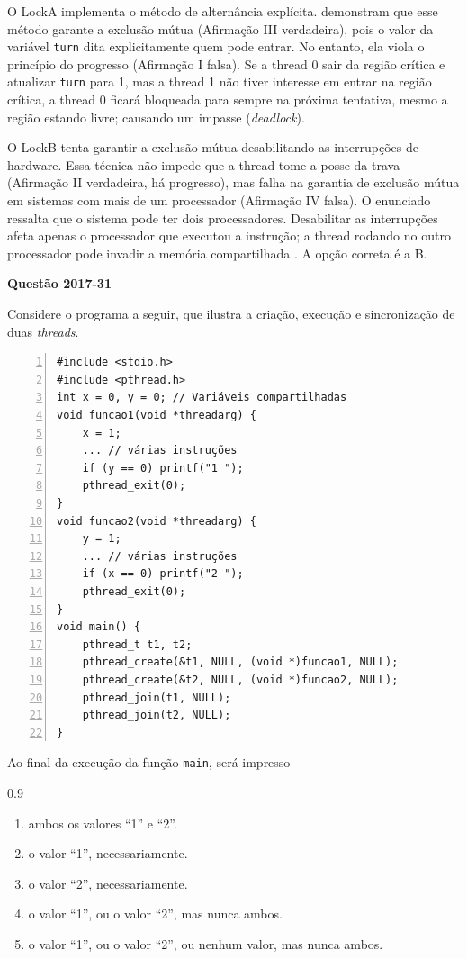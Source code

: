 \documentclass[12pt,a4paper]{article}
\newenvironment{Question}[1]{%
    \pdfbookmark[3]{Questão #1}{q:#1}
    \label{q:#1}
    \par\bigskip\noindent
    \textbf{Questão #1} \dotfill
    \par\noindent
    \nopagebreak
    \ignorespaces
}{%
    \noindent\dotfill
}
\newenvironment{QuestionOptions}{%
    \begin{spacing}{0.9}%
    \small
    \begin{enumerate}[label=\Alph*)]
}{%
    \end{enumerate}
    \end{spacing}
}
\begin{document}
O LockA implementa o método de alternância explícita.
\textcite[seç.~2.3.2--3]{tanenbaum2016} demonstram que esse método garante a exclusão mútua (Afirmação III verdadeira),
pois o valor da variável \texttt{turn} dita explicitamente quem pode entrar.
No entanto, ela viola o princípio do progresso (Afirmação I falsa).
Se a thread 0 sair da região crítica e atualizar \texttt{turn} para 1,
mas a thread 1 não tiver interesse em entrar na região crítica, a thread 0 ficará bloqueada para sempre na próxima tentativa,
mesmo a região estando livre; causando um impasse (\textit{deadlock}).

O LockB tenta garantir a exclusão mútua desabilitando as interrupções de hardware.
Essa técnica não impede que a thread tome a posse da trava (Afirmação II verdadeira, há progresso),
mas falha na garantia de exclusão mútua em sistemas com mais de um processador (Afirmação IV falsa).
O enunciado ressalta que o sistema pode ter dois processadores.
Desabilitar as interrupções afeta apenas o processador que executou a instrução;
a thread rodando no outro processador pode invadir a memória compartilhada \parencite[seç.~2.3.1]{tanenbaum2016}.
A opção correta é a B.

\begin{Question}{2017-31}
Considere o programa a seguir, que ilustra a criação, execução e sincronização de duas \textit{threads}.
\begin{Verbatim}[numbers=left]
#include <stdio.h>
#include <pthread.h>
int x = 0, y = 0; // Variáveis compartilhadas
void funcao1(void *threadarg) {
    x = 1;
    ... // várias instruções
    if (y == 0) printf("1 ");
    pthread_exit(0);
}
void funcao2(void *threadarg) {
    y = 1;
    ... // várias instruções
    if (x == 0) printf("2 ");
    pthread_exit(0);
}
void main() {
    pthread_t t1, t2;
    pthread_create(&t1, NULL, (void *)funcao1, NULL);
    pthread_create(&t2, NULL, (void *)funcao2, NULL);
    pthread_join(t1, NULL);
    pthread_join(t2, NULL);
}
\end{Verbatim}
Ao final da execução da função \texttt{main}, será impresso
\begin{QuestionOptions}
    \item ambos os valores ``1'' e ``2''.
    \item o valor ``1'', necessariamente.
    \item o valor ``2'', necessariamente.
    \item o valor ``1'', ou o valor ``2'', mas nunca ambos.
    \item o valor ``1'', ou o valor ``2'', ou nenhum valor, mas nunca ambos.
\end{QuestionOptions}
\end{Question}
\end{document}
